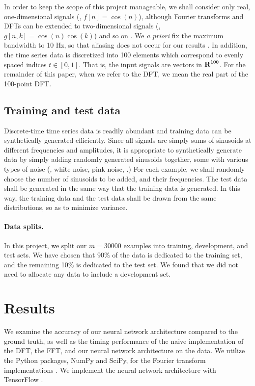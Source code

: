 \documentclass[12pt]{article}
\begin{document}
In order to keep the scope of this project manageable, we shall consider only real, one-dimensional 
signals (\eg, $f[n] = \cos(n)$), although Fourier transforms and DFTs can be extended to two-dimensional signals 
(\eg, $g[n,k] = \cos(n)\cos(k)$) and so on \cite{O:17}. 
We \emph{a priori} fix the maximum bandwidth to 10 Hz, 
so that aliasing does not occur for our results \cite{OS:99}. In addition, the time series data is discretized 
into 100 elements which correspond to evenly spaced indices $t \in [0,1]$. That is, the input signals are vectors in 
${\mbox{\bf R}}^{100}$. For the remainder of this paper, when we refer to the DFT, we mean the real part of the 
100-point DFT. 


\subsection{Training and test data} Discrete-time time series data is readily abundant and 
training data can be synthetically generated efficiently. Since all signals are simply sums of 
sinusoids at different frequencies and amplitudes, it is appropriate to synthetically generate
data by simply adding randomly generated sinusoids together, some with various types of noise 
(\eg, white noise, pink noise, \etc.) For each example, we shall randomly choose the number of 
sinusoids to be added, and their frequencies. The test data shall be generated in the same way that the 
training data is generated. In this way, the training data and the test data shall be drawn from the same 
distributions, so as to minimize variance.

\paragraph{Data splits.} In this project, we split our $m=30000$ examples into training, development, and test
sets. We have chosen that 90\% of the data is dedicated to the training set, and the remaining 10\% is 
dedicated to the test set. We found that we did not need to allocate any data to include a development set.

\section{Results} 
We examine the accuracy of our neural network architecture compared to the ground truth, as well as the 
timing performance of the naive implementation of the DFT, the FFT, and our neural network architecture
on the data. We utilize the Python packages, NumPy and SciPy, for the Fourier transform implementations 
\cite{SCIPY,NUMPY}. We implement the neural network architecture with TensorFlow \cite{TENSORFLOW}.
\end{document}
